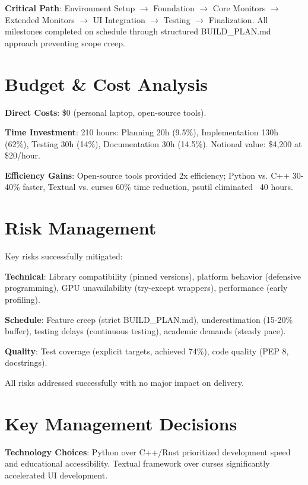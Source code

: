 \documentclass[12pt,a4paper,oneside]{report}
\begin{document}
\textbf{Critical Path}: Environment Setup $\rightarrow$ Foundation $\rightarrow$ Core Monitors $\rightarrow$ Extended Monitors $\rightarrow$ UI Integration $\rightarrow$ Testing $\rightarrow$ Finalization. All milestones completed on schedule through structured BUILD\_PLAN.md approach preventing scope creep.

\section{Budget \& Cost Analysis}
\label{sec:budget}

\textbf{Direct Costs}: \$0 (personal laptop, open-source tools).

\textbf{Time Investment}: 210 hours: Planning 20h (9.5\%), Implementation 130h (62\%), Testing 30h (14\%), Documentation 30h (14.5\%). Notional value: \$4,200 at \$20/hour.

\textbf{Efficiency Gains}: Open-source tools provided 2x efficiency; Python vs. C++ 30-40\% faster, Textual vs. curses 60\% time reduction, psutil eliminated ~40 hours.

\section{Risk Management}
\label{sec:risk-analysis}

Key risks successfully mitigated:

\textbf{Technical}: Library compatibility (pinned versions), platform behavior (defensive programming), GPU unavailability (try-except wrappers), performance (early profiling).

\textbf{Schedule}: Feature creep (strict BUILD\_PLAN.md), underestimation (15-20\% buffer), testing delays (continuous testing), academic demands (steady pace).

\textbf{Quality}: Test coverage (explicit targets, achieved 74\%), code quality (PEP 8, docstrings).

All risks addressed successfully with no major impact on delivery.

\section{Key Management Decisions}
\label{sec:management-decisions}

\textbf{Technology Choices}: Python over C++/Rust prioritized development speed and educational accessibility. Textual framework over curses significantly accelerated UI development.
\end{document}

